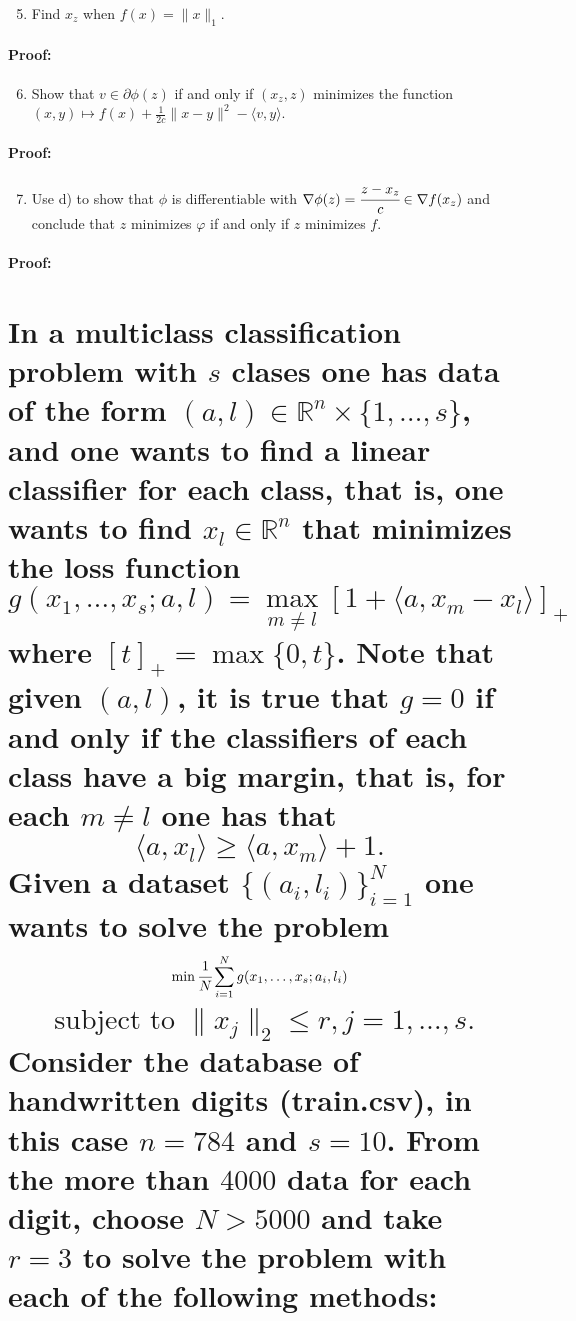 \documentclass[10pt]{article}
\begin{document}
\blindtext

\begin{enumerate}[label=\alph*)]
  \setcounter{enumi}{4}
  \item Find $x_z$ when $f(x) = \|x\|_1$.
\end{enumerate}

\paragraph{Proof:}

\blindtext

\begin{enumerate}[label=\alph*)]
  \setcounter{enumi}{5}
  \item Show that $v \in \partial \phi(z)$ if and only if $(x_z, z)$ minimizes the function $(x,y) \mapsto f(x) + \frac{1}{2c} \| x - y \|^2 - \langle v, y \rangle$.
\end{enumerate}

\paragraph{Proof:}

\blindtext

\begin{enumerate}[label=\alph*)]
  \setcounter{enumi}{6}
  \item Use d) to show that $\phi$ is differentiable with $\nabla \phi(z) = \cfrac{z-x_z}{c} \in \nabla f(x_z)$ and conclude that $z$ minimizes $\varphi$ if and only if $z$ minimizes $f$.
\end{enumerate}

\paragraph{Proof:}

\blindtext

\fi

\setcounter{section}{2}

\section{In a multiclass classification problem with $s$ clases one has data of the form $(a,l) \in \mathbb{R}^n \times \{ 1, \ldots, s \}$, and one wants to find a linear classifier for each class, that is, 
one wants to find $x_l \in \mathbb{R}^n$ that minimizes the loss function $$ g(x_1, \ldots, x_s; a, l) = \max_{m \neq l} [ 1 + \langle a, x_m - x_l \rangle]_+$$
where $[t]_+ = \max \{ 0, t \}$. Note that given $(a,l)$, it is true that $g=0$ if and only if the 
classifiers of each class have a big margin, that is, for each $m \neq l$ one has that $$ \langle a, x_l \rangle \geq \langle a, x_m \rangle + 1.$$ Given a dataset $\{ (a_i, l_i) \}_{i=1}^N$ one wants to solve the problem $$\min \cfrac{1}{N} \sum_{i=1}^N g(x_1, \ldots, x_s; a_i, l_i) $$
  $$\text{ subject to } \|x_j\|_2 \leq r, j=1, \ldots, s.$$
Consider the database of handwritten digits (train.csv), in this case $n=784$ and $s=10$. From the more than $4000$ data for each digit, choose $N>5000$ and take $r=3$ to solve the problem with 
each of the following methods:}
\end{document}
